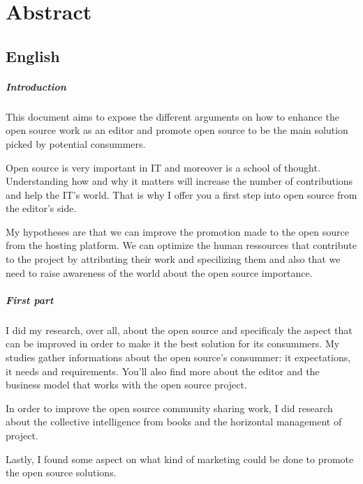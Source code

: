 \chapter*{Abstract}

\section*{English}
	
	\paragraph*{Introduction\\}

	This document aims to expose the different arguments on how to enhance the open source work as an editor and promote open source to be the main solution picked by potential consummers.

	Open source is very important in IT and moreover is a school of thought. Understanding how and why it matters will increase the number of contributions and help the IT's world. That is why I offer you a first step into open source from the editor's side.

	My hypotheses are that we can improve the promotion made to the open source from the hosting platform. We can optimize the human ressources that contribute to the project by attributing their work and specilizing them and also that we need to raise awareness of the world about the open source importance.

	\paragraph*{First part\\}

	I did my research, over all, about the open source and specificaly the aspect that can be improved in order to make it the best solution for its consummers.
	My studies gather informations about the open source's consummer: it expectations, it needs and requirements. You'll also find more about the editor and the business model that works with the open source project.

	In order to improve the open source community sharing work, I did research about the collective intelligence from books and the horizontal management of project.

	Lastly, I found some aspect on what kind of marketing could be done to promote the open source solutions.

